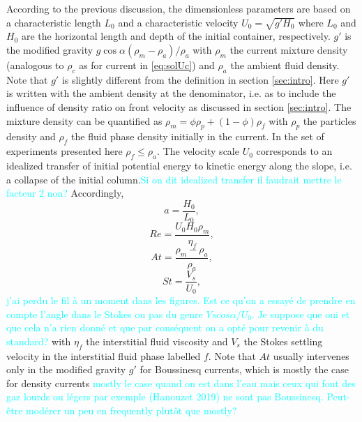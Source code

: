 \documentclass[twocolumn]{article}
\newcommand*{\marie}{\textcolor{Cyan}}
\begin{document}
According to the previous discussion, the dimensionless parameters are based on a characteristic length $L_0$ and a characteristic velocity $U_0=\sqrt{g' H_0}$ where $L_0$ and $H_0$ are the horizontal length and depth of the initial container, respectively. $g'$ is the modified gravity $ g \cos{\alpha}(\rho_m-\rho_a)/\rho_a$ with $\rho_m$ the current mixture density (analogous to $\rho_c$ as for current in \eqref{eq:solUc}) and $\rho_a$ the ambient fluid density. Note that $g'$ is slightly different from the definition in section \ref{sec:intro}. Here $g'$ is written with the ambient density at the denominator, i.e. as to include the influence of density ratio on front velocity as discussed in section \ref{sec:intro}. The mixture density can be quantified as $\rho_m = \phi \rho_p+(1-\phi)\rho_f$ with $\rho_p$ the particles density and $\rho_f$ the fluid phase density initially in the current. In the set of experiments presented here $\rho_f\le \rho_a$. The velocity scale $U_0$ corresponds to an idealized transfer of initial potential energy to kinetic energy along the slope, i.e. a collapse of the initial column.\marie{Si on dit idealized transfer il faudrait mettre le facteur 2 non?} Accordingly,
\begin{equation}
	\displaystyle a =\frac{H_0}{L_0},
\end{equation}
\begin{equation}
	\displaystyle Re = \frac{U_0 H_0\rho_m}{\eta_f},
\end{equation}
\begin{equation}
	\displaystyle At = \frac{\rho_m-\rho_a}{\rho_a},
\end{equation}
\begin{equation}
	\displaystyle St = \frac{V_s}{U_0},
\end{equation}
\marie{j'ai perdu le fil à un moment dans les figures. Est ce qu'on a essayé de prendre en compte l'angle dans le Stokes ou pas du genre $Vscos\alpha/U_0$. Je suppose que oui et que cela n'a rien donné et que par conséquent on a opté pour revenir à du standard?}
with $\eta_f$ the interstitial fluid viscosity and $V_s$ the Stokes settling velocity in the interstitial fluid phase labelled $f$. Note that $At$ usually intervenes only in the modified gravity $g'$ for Boussinesq currents, which is mostly the case for density currents \citep{Bonometti2011,???}\marie{mostly le case quand on est dans l'eau mais ceux qui font des gaz lourds ou légers par exemple (Hanouzet 2019) ne sont pas Boussinesq. Peut-être modérer un peu en frequently plutôt que mostly?}
\end{document}
